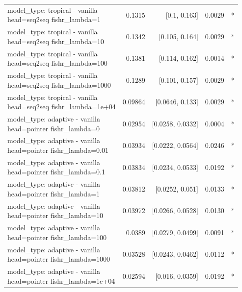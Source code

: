 \documentclass[10pt]{article}
\makeatletter
\newcommand{\stackcell}[1]{\begin{tabular}[t]{@{}l@{}}#1\end{tabular}}
\makeatother
\begin{document}
{\begin{longtable}{lrrrl}
\stackcell{model\_type: tropical - vanilla\\\footnotesize head=seq2seq fishr\_lambda=1 } & 0.1315 & [0.1, 0.163] & 0.0029 & *\\
\stackcell{model\_type: tropical - vanilla\\\footnotesize head=seq2seq fishr\_lambda=10 } & 0.1342 & [0.105, 0.164] & 0.0029 & *\\
\stackcell{model\_type: tropical - vanilla\\\footnotesize head=seq2seq fishr\_lambda=100 } & 0.1381 & [0.114, 0.162] & 0.0014 & *\\
\stackcell{model\_type: tropical - vanilla\\\footnotesize head=seq2seq fishr\_lambda=1000 } & 0.1289 & [0.101, 0.157] & 0.0029 & *\\
\stackcell{model\_type: tropical - vanilla\\\footnotesize head=seq2seq fishr\_lambda=1e+04 } & 0.09864 & [0.0646, 0.133] & 0.0029 & *\\
\stackcell{model\_type: adaptive - vanilla\\\footnotesize head=pointer fishr\_lambda=0 } & 0.02954 & [0.0258, 0.0332] & 0.0004 & *\\
\stackcell{model\_type: adaptive - vanilla\\\footnotesize head=pointer fishr\_lambda=0.01 } & 0.03934 & [0.0222, 0.0564] & 0.0246 & *\\
\stackcell{model\_type: adaptive - vanilla\\\footnotesize head=pointer fishr\_lambda=0.1 } & 0.03834 & [0.0234, 0.0533] & 0.0192 & *\\
\stackcell{model\_type: adaptive - vanilla\\\footnotesize head=pointer fishr\_lambda=1 } & 0.03812 & [0.0252, 0.051] & 0.0133 & *\\
\stackcell{model\_type: adaptive - vanilla\\\footnotesize head=pointer fishr\_lambda=10 } & 0.03972 & [0.0266, 0.0528] & 0.0130 & *\\
\stackcell{model\_type: adaptive - vanilla\\\footnotesize head=pointer fishr\_lambda=100 } & 0.0389 & [0.0279, 0.0499] & 0.0091 & *\\
\stackcell{model\_type: adaptive - vanilla\\\footnotesize head=pointer fishr\_lambda=1000 } & 0.03528 & [0.0243, 0.0462] & 0.0112 & *\\
\stackcell{model\_type: adaptive - vanilla\\\footnotesize head=pointer fishr\_lambda=1e+04 } & 0.02594 & [0.016, 0.0359] & 0.0192 & *\\

\end{longtable}}
\end{document}
